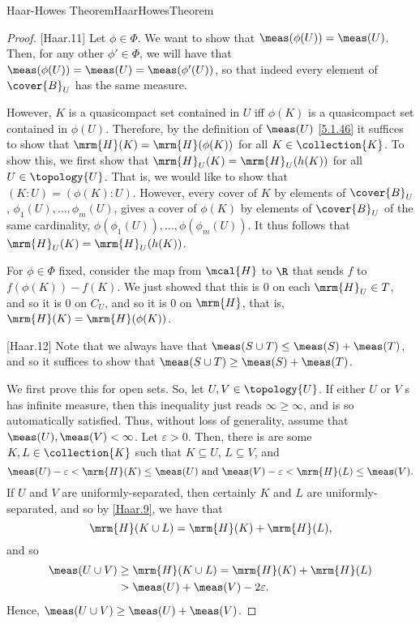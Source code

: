 \begin{thm}{Haar-Howes Theorem}{HaarHowesTheorem}
\begin{proof}
[Haar.11]
Let $\phi \in \Phi$.  We want to show that $\meas (\phi (U))=\meas (U)$.  Then, for any other $\phi '\in \Phi$, we will have that $\meas (\phi (U))=\meas (U)=\meas (\phi '(U))$, so that indeed every element of $\cover{B}_U$ has the same measure.

However, $K$ is a quasicompact set contained in $U$ iff $\phi (K)$ is a quasicompact set contained in $\phi (U)$.  Therefore, by the definition of $\meas (U)$ \eqref{5.1.46} it suffices to show that $\mrm{H}(K)=\mrm{H}(\phi (K))$ for all $K\in \collection{K}$.  To show this, we first show that $\mrm{H}_U(K)=\mrm{H}_U(h(K))$ for all $U\in \topology{U}$.  That is, we would like to show that $(K:U)=(\phi (K):U)$.  However, every cover of $K$ by elements of $\cover{B}_U$, $\phi _1(U),\ldots ,\phi _m(U)$, gives a cover of $\phi (K)$ by elements of $\cover{B}_U$ of the same cardinality, $\phi (\phi _1(U)),\ldots ,\phi (\phi _m(U))$.  It thus follows that $\mrm{H}_U(K)=\mrm{H}_U(h(K))$.

For $\phi \in \Phi$ fixed, consider the map from $\mcal{H}$ to $\R$ that sends $f$ to $f(\phi (K))-f(K)$.  We just showed that this is $0$ on each $\mrm{H}_U\in T$, and so it is $0$ on $C_U$, and so it is $0$ on $\mrm{H}$, that is, $\mrm{H}(K)=\mrm{H}(\phi (K))$.

[Haar.12]
Note that we always have that $\meas (S\cup T)\leq \meas (S)+\meas (T)$, and so it suffices to show that $\meas (S\cup T)\geq \meas (S)+\meas (T)$.

We first prove this for open sets.  So, let $U,V\in \topology{U}$.  If either $U$ or $V$ s has infinite measure, then this inequality just reads $\infty \geq \infty$, and is so automatically satisfied.  Thus, without loss of generality, assume that $\meas (U),\meas (V)<\infty$.  Let $\varepsilon >0$.  Then, there is are some $K,L\in \collection{K}$ such that $K\subseteq U$, $L\subseteq V$, and
\begin{equation*}
\meas (U)-\varepsilon <\mrm{H}(K)\leq \meas (U)\text{ and }\meas (V)-\varepsilon <\mrm{H}(L)\leq \meas (V).
\end{equation*}
If $U$ and $V$ are uniformly-separated, then certainly $K$ and $L$ are uniformly-separated, and so by \cref{Haar.9}, we have that
\begin{equation}
\mrm{H}(K\cup L)=\mrm{H}(K)+\mrm{H}(L),
\end{equation}
and so
\begin{equation}
\begin{split}
\meas (U\cup V) & \geq \mrm{H}(K\cup L)=\mrm{H}(K)+\mrm{H}(L) \\
& >\meas (U)+\meas (V)-2\varepsilon .
\end{split}
\end{equation}
Hence, $\meas (U\cup V)\geq \meas (U)+\meas (V)$.


\end{proof}
\end{thm}
